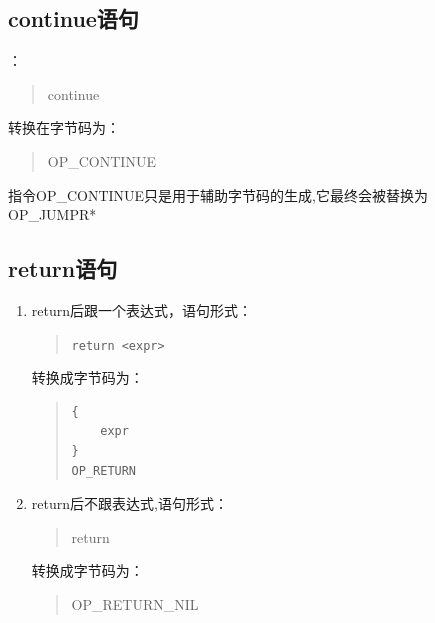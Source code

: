 \subsection{continue语句}
：
\begin{quote}
continue 
\end{quote}
转换在字节码为：
\begin{quote}
OP\_CONTINUE 
\end{quote}
指令OP\_CONTINUE只是用于辅助字节码的生成,它最终会被替换为OP\_JUMPR*

\subsection{return语句}
\begin{enumerate}
\item return后跟一个表达式，语句形式：
\begin{quote}
\verb|return <expr>|
\end{quote}
转换成字节码为：
\begin{quote}
\begin{verbatim}
{
    expr
}
OP_RETURN
\end{verbatim}
\end{quote}

\item return后不跟表达式,语句形式：
\begin{quote}
return 
\end{quote}
转换成字节码为：
\begin{quote}
OP\_RETURN\_NIL
\end{quote}
\end{enumerate}

